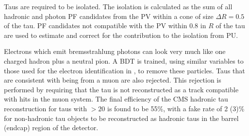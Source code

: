 Taus are required to be isolated. The isolation is calculated as the sum of all hadronic and photon \ac{PF} candidates from the \ac{PV} within a cone of size $\Delta R=0.5$ of the tau. \ac{PF} candidates not compatible with the \ac{PV} within 0.8 in $R$ of the tau are used to estimate and correct for the contribution to the isolation from \ac{PU}. 

Electrons which emit bremsstrahlung photons can look very much like one charged hadron plus a neutral pion. A \ac{BDT} is trained, using similar variables to those used for the electron identification in , to remove these particles. Taus that are consistent with being from a muon are also rejected. This rejection is performed by requiring that the tau is not reconstructed as a track compatible with hits in the muon system. The final efficiency of the CMS hadronic tau reconstruction for taus with \pt$>20$ \GeV is found to be 55\%, with a fake rate of 2 (3)\% for non-hadronic tau objects to be reconstructed as hadronic taus in the barrel (endcap) region of the detector.

